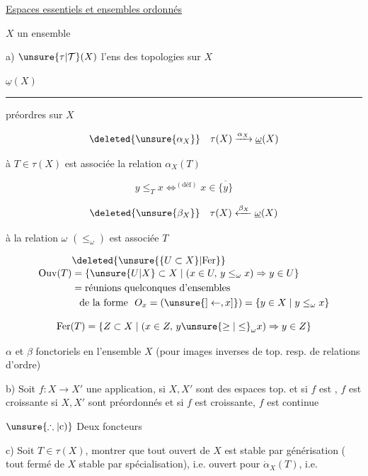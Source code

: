 \uline{Espaces essentiels et ensembles ordonnés}

$X$ un ensemble

a) $\unsure{\tau|\mathcal T}(X)$ l'ens des topologies sur $X$

$\underline\omega(X)$ \rule{2.6em}{0.35pt} préordres sur $X$

\[
\deleted{\unsure{\alpha_X}}\quad \tau(X)\xrightarrow{\alpha_X}\underline\omega(X)
\]

à $T\in\tau(X)$ est associée la relation $\alpha_X(T)$

\[
y\leq_T x\mathrel{\mathop{\Longleftrightarrow}^{(\text{déf})}}x\in\overline{\{y\}}
\]

\[
\deleted{\unsure{\beta_X}}\quad\tau(X)\xleftarrow{\beta_X}\underline\omega(X)
\]

à la relation $\omega$ $({\leq}_{\omega})$ est associée $T$

\[
\begin{aligned}
&\deleted{\unsure{\{U\subset X\}|\mathrm{Fer}}}\\[-2pt]
\mathrm{Ouv}(T)&=\{\unsure{U|X}\subset X\mid(x\in U,\,y\leq_{\omega}x)\Rightarrow y\in U\}\\
&=\text{réunions quelconques d'ensembles}\\
&\phantom{=}\text{de la forme }\ O_x=(\unsure{]\leftarrow,x]})=\{y\in X\mid y\leq_{\omega} x\}
\end{aligned}
\]

\[
\mathrm{Fer}(T)=\{Z\subset X\mid(x\in Z,\,y\unsure{\geq|\leq}_{\omega}x)\Rightarrow y\in Z\}
\]

$\alpha$ et $\beta$ fonctoriels en l'ensemble $X$
(pour images inverses de top. resp. de relations d'ordre)

b) Soit $f:X\longrightarrow X'$ une application, 
si $X,X'$ sont des espaces top. et si $f$ est , $f$ est croissante
si $X,X'$ sont préordonnés et si $f$ est croissante, $f$ est continue

$\unsure{\therefore|\text{c)}}$ Deux foncteurs


c) 
Soit $T\in\tau(X)$, montrer que  tout ouvert de $X$ est stable par générisation
( tout fermé de $X$ stable par spécialisation), i.e. ouvert pour $\dot\alpha_X(T)$, i.e.

